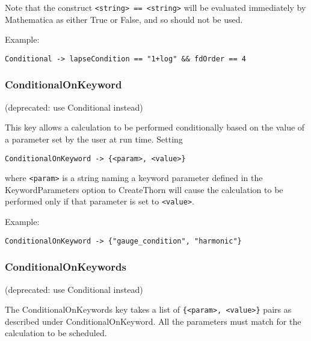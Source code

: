 \documentclass{report}
\begin{document}
Note that the construct \verb|<string> == <string>| will be evaluated
immediately by Mathematica as either True or False, and so should not
be used.
 
Example:

\begin{center}
\begin{minipage}{0.8 \textwidth}
\begin{verbatim}
Conditional -> lapseCondition == "1+log" && fdOrder == 4
\end{verbatim}
\end{minipage}
\end{center}

\subsubsection{ConditionalOnKeyword}

(deprecated: use Conditional instead)

This key allows a calculation to be performed conditionally based on
the value of a parameter set by the user at run time.  Setting
\begin{center}
\begin{minipage}{0.8 \textwidth}
\begin{verbatim}
ConditionalOnKeyword -> {<param>, <value>}
\end{verbatim}
\end{minipage}
\end{center}
where \verb|<param>| is a string naming a keyword parameter defined in
the KeywordParameters option to CreateThorn will cause the calculation
to be performed only if that parameter is set to \verb|<value>|.

Example:

\begin{center}
\begin{minipage}{0.8 \textwidth}
\begin{verbatim}
ConditionalOnKeyword -> {"gauge_condition", "harmonic"}
\end{verbatim}
\end{minipage}
\end{center}

\subsubsection{ConditionalOnKeywords}

(deprecated: use Conditional instead)

The ConditionalOnKeywords key takes a list of
\verb|{<param>, <value>}| pairs as described under
ConditionalOnKeyword.  All the parameters must match for the
calculation to be scheduled.
\end{document}
